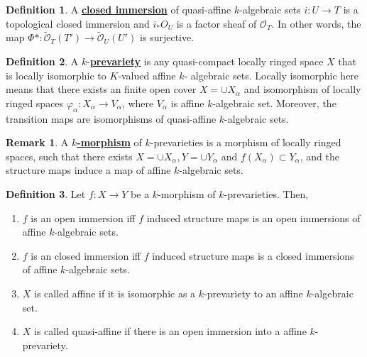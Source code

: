 \documentclass{article}
\theoremstyle{definition}
\theoremstyle{definition}
\newtheorem{definition}{Definition}[theorem]
\theoremstyle{definition}
\newtheorem{remark}{Remark}[theorem]
\theoremstyle{definition}
\theoremstyle{definition}
\theoremstyle{definition}
\theoremstyle{definition}
\begin{document}
\begin{tcolorbox}[colback=purple!5!white,colframe=purple!75!black]
\begin{definition}
A \underline{\textbf{closed immersion}} of quasi-affine $k$-algebraic sets $i: U\to T$ is a topological closed immersion and $i_*O_U$ is a factor sheaf of $\mathcal{O}_T$. In other words, the map $\Phi*: \tilde{\mathcal{O}}_T(T')\to \tilde{\mathcal{O}}_U(U')$ is surjective. 


\end{definition}
\end{tcolorbox}


\begin{tcolorbox}[colback=purple!5!white,colframe=purple!75!black]
\begin{definition}
A $k$-\underline{\textbf{prevariety}} is any quasi-compact locally ringed space $X$ that is locally isomorphic to $K$-valued affine $k$- algebraic sets. Locally isomorphic here means that there exists an finite open cover $X=\cup X_{\alpha}$ and isomorphism of locally ringed spaces $\varphi_{\alpha}: X_{\alpha}\to V_{\alpha}$, where $V_{\alpha}$ is affine $k$-algebraic set. Moreover, the transition maps are isomorphisms of quasi-affine $k$-algebraic sets. 
\end{definition}
\end{tcolorbox}


\begin{tcolorbox}[colback=green!5!white,colframe=green!30!white]
\begin{remark}
A $k$\underline{\textbf{-morphism}} of $k$-prevarieties is a morphism of locally ringed spaces, such that there exists $X=\cup X_{\alpha}, Y=\cup Y_{\alpha}$ and $f(X_{\alpha})\subset Y_{\alpha}$, and the structure maps induce a map of affine $k$-algebraic sets.
\end{remark}
\end{tcolorbox}


\begin{tcolorbox}[colback=purple!5!white,colframe=purple!75!black]
\begin{definition}
Let $f: X\to Y$ be a $k$-morphism of $k$-prevarieties. Then, 
\begin{enumerate}
    \item $f$ is an open immersion iff $f$ induced structure maps is an open immersions of affine $k$-algebraic sets.
    \item $f$ is an closed immersion iff $f$ induced structure maps is a closed immersions of affine $k$-algebraic sets.
    \item $X$ is called affine if it is isomorphic as a $k$-prevariety to an affine $k$-algebraic set. 
    \item $X$ is called quasi-affine if there is an open immersion into a affine $k$-prevariety. 
\end{enumerate}
\end{definition}
\end{tcolorbox}
\end{document}
